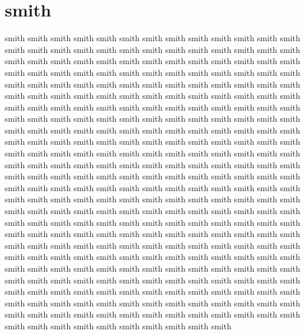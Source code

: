 \documentclass[a4paper, 12pt]{article}
\begin{document}
\section{smith}
smith smith smith smith smith smith smith smith smith smith smith smith smith smith smith smith smith smith smith smith smith smith smith smith smith smith smith smith smith smith smith smith smith smith smith smith smith smith smith smith smith smith smith smith smith smith smith smith smith smith smith smith smith smith smith smith smith smith smith smith smith smith smith smith smith smith smith smith smith smith smith smith smith smith smith smith smith smith smith smith smith smith smith smith smith smith smith smith smith smith smith smith smith smith smith smith smith smith smith smith smith smith smith smith smith smith smith smith smith smith smith smith smith smith smith smith smith smith smith smith smith smith smith smith smith smith smith smith smith smith smith smith smith smith smith smith smith smith smith smith smith smith smith smith smith smith smith smith smith smith smith smith smith smith smith smith smith smith smith smith smith smith smith smith smith smith smith smith smith smith smith smith smith smith smith smith smith smith smith smith smith smith smith smith smith smith smith smith smith smith smith smith smith smith smith smith smith smith smith smith smith smith smith smith smith smith smith smith smith smith smith smith smith smith smith smith smith smith smith smith smith smith smith smith smith smith smith smith smith smith smith smith smith smith smith smith smith smith smith smith smith smith smith smith smith smith smith smith smith smith smith smith smith smith smith smith smith smith smith smith smith smith smith smith smith smith smith smith smith smith smith smith smith smith smith smith smith smith smith smith smith smith smith smith smith smith smith smith smith smith smith smith smith smith smith smith smith smith smith smith smith smith smith smith smith smith smith smith smith smith smith smith smith smith smith smith smith smith smith smith smith smith smith smith smith smith smith smith smith smith smith smith smith smith smith 
\end{document}
